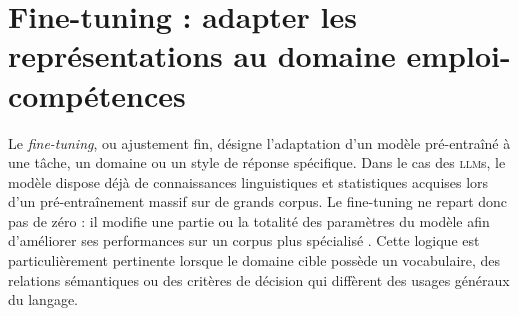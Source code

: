\documentclass[12pt,twoside]{report}
\newcommand{\source}[1]{%
  \par\vspace{0.2\baselineskip}
  {\centering\footnotesize\itshape Source : #1\par}
}
\newcommand{\tabheader}[1]{\textcolor{white}{\textbf{#1}}}
\newcommand{\tableStyleStart}{%
  \small
  \renewcommand{\arraystretch}{1.12}%
  \setlength{\tabcolsep}{4pt}%
  \rowcolors{2}{lightblue!12}{white}%
}
\newcommand{\tableStyleEnd}{%
  \rowcolors{2}{}{}%
  \renewcommand{\arraystretch}{1}%
}
\newcommand{\BERT}{\textsc{bert}}
\newcommand{\ESCO}{\textsc{esco}}
\newcommand{\NCM}{\textsc{ncm}}
\newcommand{\LLM}{\textsc{llm}}
\begin{document}
 
 
\section{Fine-tuning : adapter les représentations au domaine emploi-compétences}
Le \emph{fine-tuning}, ou ajustement fin, désigne l'adaptation d'un modèle pré-entraîné à une tâche, un domaine ou un style de réponse spécifique. Dans le cas des \LLM{}s, le modèle dispose déjà de connaissances linguistiques et statistiques acquises lors d'un pré-entraînement massif sur de grands corpus. Le fine-tuning ne repart donc pas de zéro : il modifie une partie ou la totalité des paramètres du modèle afin d'améliorer ses performances sur un corpus plus spécialisé \cite{devlin2018bert,raffel2020t5}. Cette logique est particulièrement pertinente lorsque le domaine cible possède un vocabulaire, des relations sémantiques ou des critères de décision qui diffèrent des usages généraux du langage.
\end{document}
